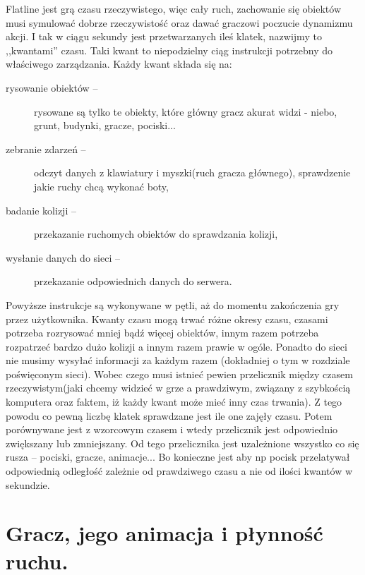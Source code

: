 \documentclass[licencjacka]{pracamgr}
\begin{document}
Flatline jest grą czasu rzeczywistego, więc cały ruch, zachowanie się obiektów musi symulować dobrze rzeczywistość
oraz dawać graczowi poczucie dynamizmu akcji. I tak w ciągu sekundy jest przetwarzanych ileś klatek, nazwijmy to
,,kwantami'' czasu. Taki kwant to niepodzielny ciąg instrukcji potrzebny do właściwego zarządzania.
Każdy kwant składa się na:

\begin{description}
\item[rysowanie obiektów -- ] rysowane są tylko te obiekty, które główny gracz akurat widzi - niebo, grunt, budynki, gracze, pociski...
\item[zebranie zdarzeń -- ] odczyt danych z klawiatury i myszki(ruch gracza głównego), sprawdzenie jakie ruchy chcą wykonać boty,
\item[badanie kolizji -- ] przekazanie ruchomych obiektów do sprawdzania kolizji,
\item[wysłanie danych do sieci -- ] przekazanie odpowiednich danych do serwera.
\end{description}

Powyższe instrukcje są wykonywane w pętli, aż do momentu zakończenia gry przez użytkownika. Kwanty czasu mogą
trwać różne okresy czasu, czasami potrzeba rozrysować mniej bądź więcej obiektów, innym razem potrzeba rozpatrzeć
bardzo dużo kolizji a innym razem prawie w ogóle. Ponadto do sieci nie musimy wysyłać informacji za każdym razem
(dokładniej o tym w rozdziale poświęconym sieci). Wobec czego musi istnieć pewien przelicznik między czasem
rzeczywistym(jaki chcemy widzieć w grze a prawdziwym, związany z szybkością komputera oraz faktem, iż każdy kwant
może mieć inny czas trwania). Z tego powodu co pewną liczbę klatek sprawdzane jest ile one zajęły czasu. Potem
porównywane jest z wzorcowym czasem i wtedy przelicznik jest odpowiednio zwiększany lub zmniejszany.
Od tego przelicznika jest uzależnione wszystko co się rusza -- pociski, gracze, animacje...
Bo konieczne jest aby np pocisk przelatywał odpowiednią odległość zależnie od prawdziwego czasu a nie od ilości
kwantów w sekundzie.

\section{Gracz, jego animacja i płynność ruchu.}
\end{document}
